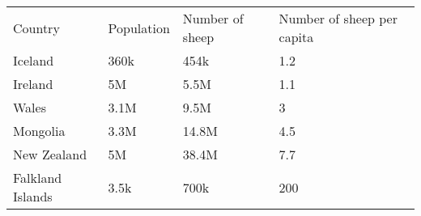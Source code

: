 \begin{table}[htbp]
\begin{tabular}{llll}
Country          & Population & Number of sheep & Number of sheep per capita \\
Iceland          & 360k       & 454k            & 1.2                        \\
Ireland          & 5M         & 5.5M            & 1.1                        \\
Wales            & 3.1M       & 9.5M            & 3                          \\
Mongolia         & 3.3M       & 14.8M           & 4.5                        \\
New Zealand      & 5M         & 38.4M           & 7.7                        \\
Falkland Islands & 3.5k       & 700k            & 200                       
\end{tabular}
\label{tab:sheep per capita}
\end{table}